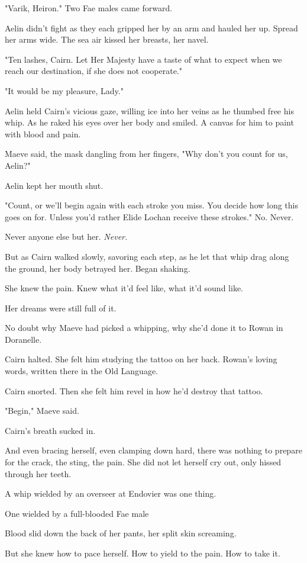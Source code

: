 "Varik, Heiron." Two Fae males came forward.

Aelin didn't fight as they each gripped her by an arm and hauled her up. Spread her arms wide. The sea air kissed her breasts, her navel.

"Ten lashes, Cairn. Let Her Majesty have a taste of what to expect when we reach our destination, if she does not cooperate."

"It would be my pleasure, Lady."

Aelin held Cairn's vicious gaze, willing ice into her veins as he thumbed free his whip. As he raked his eyes over her body and smiled. A canvas for him to paint with blood and pain.

Maeve said, the mask dangling from her fingers, "Why don't you count for us, Aelin?"

Aelin kept her mouth shut.

"Count, or we'll begin again with each stroke you miss. You decide how long this goes on for. Unless you'd rather Elide Lochan receive these strokes." No. Never.

Never anyone else but her. \emph{Never.}

But as Cairn walked slowly, savoring each step, as he let that whip drag along the ground, her body betrayed her. Began shaking.

She knew the pain. Knew what it'd feel like, what it'd sound like.

Her dreams were still full of it.

No doubt why Maeve had picked a whipping, why she'd done it to Rowan in Doranelle.

Cairn halted. She felt him studying the tattoo on her back. Rowan's loving words, written there in the Old Language.

Cairn snorted. Then she felt him revel in how he'd destroy that tattoo.

"Begin," Maeve said.

Cairn's breath sucked in.

And even bracing herself, even clamping down hard, there was nothing to prepare for the crack, the sting, the pain. She did not let herself cry out, only hissed through her teeth.

A whip wielded by an overseer at Endovier was one thing.

One wielded by a full-blooded Fae male 

Blood slid down the back of her pants, her split skin screaming.

But she knew how to pace herself. How to yield to the pain. How to take it.

